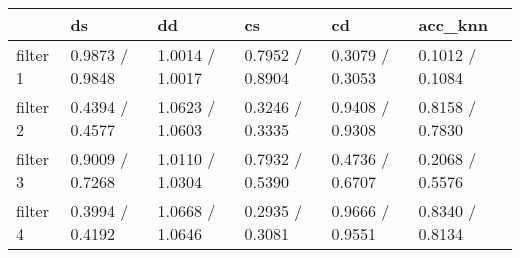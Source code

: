 \begin{tabular}{llllll}
\toprule
{} &               ds &               dd &               cs &               cd &          acc\_knn \\
\midrule
filter 1 &  0.9873 / 0.9848 &  1.0014 / 1.0017 &  0.7952 / 0.8904 &  0.3079 / 0.3053 &  0.1012 / 0.1084 \\
filter 2 &  0.4394 / 0.4577 &  1.0623 / 1.0603 &  0.3246 / 0.3335 &  0.9408 / 0.9308 &  0.8158 / 0.7830 \\
filter 3 &  0.9009 / 0.7268 &  1.0110 / 1.0304 &  0.7932 / 0.5390 &  0.4736 / 0.6707 &  0.2068 / 0.5576 \\
filter 4 &  0.3994 / 0.4192 &  1.0668 / 1.0646 &  0.2935 / 0.3081 &  0.9666 / 0.9551 &  0.8340 / 0.8134 \\
\bottomrule
\end{tabular}

